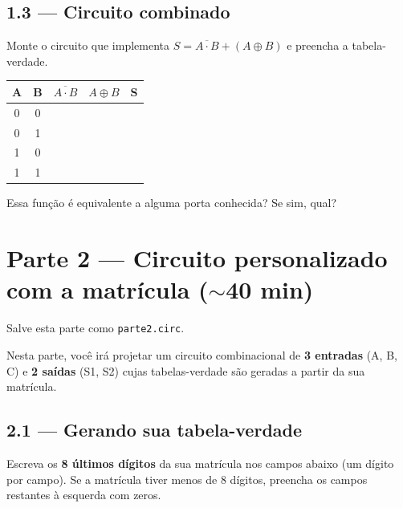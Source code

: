 \documentclass[12pt,a4paper]{article}
\newcommand{\resplinha}[1][4cm]{\underline{\hspace{#1}}}
\newcommand{\celula}{\rule{0pt}{14pt}\hspace{12pt}}
\begin{document}
\subsection{1.3 --- Circuito combinado}

Monte o circuito que implementa $S = \overline{A \cdot B} + (A \oplus B)$ e preencha a tabela-verdade.

\begin{center}
\begin{tabular}{cc|c|c|c}
\toprule
\textbf{A} & \textbf{B} & $\overline{A \cdot B}$ & $A \oplus B$ & \textbf{S} \\
\midrule
0 & 0 & \celula & \celula & \celula \\
0 & 1 & \celula & \celula & \celula \\
1 & 0 & \celula & \celula & \celula \\
1 & 1 & \celula & \celula & \celula \\
\bottomrule
\end{tabular}
\end{center}

\noindent Essa função é equivalente a alguma porta conhecida? Se sim, qual? \resplinha[6cm]

\section{Parte 2 --- Circuito personalizado com a matrícula ($\sim$40 min)}

\begin{tcolorbox}[colback=gray!5, colframe=gray!50, fontupper=\small]
Salve esta parte como \texttt{parte2.circ}.
\end{tcolorbox}

Nesta parte, você irá projetar um circuito combinacional de \textbf{3 entradas} (A, B, C) e \textbf{2 saídas} (S1, S2) cujas tabelas-verdade são geradas a partir da sua matrícula.

\subsection{2.1 --- Gerando sua tabela-verdade}

Escreva os \textbf{8 últimos dígitos} da sua matrícula nos campos abaixo (um dígito por campo).
Se a matrícula tiver menos de 8 dígitos, preencha os campos restantes à esquerda com zeros.
\end{document}
